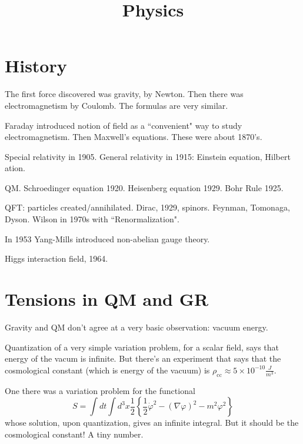 



\title{Physics}
\maketitle

\label{section-phantom}

\tableofcontents

\section{History}
\label{section-history}

The first force discovered was gravity, by Newton. Then there was
electromagnetism by Coulomb. The formulas are very similar.

Faraday introduced notion of field as a ``convenient" way to study
electromagnetism. Then Maxwell's equations. These were about 1870's.

Special relativity in 1905. General relativity in 1915: Einstein equation, Hilbert
ation.

QM. Schroedinger equation 1920. Heisenberg equation 1929. Bohr Rule 1925.

QFT: particles created/annihilated. Dirac, 1929, spinors. Feynman, Tomonaga,
Dyson. Wilson in 1970s with ``Renormalization".

In 1953 Yang-Mills introduced non-abelian gauge theory.

Higgs interaction field, 1964.

\section{Tensions in QM and GR}
\label{section-tensions}

Gravity and QM don't agree at a very basic observation: vacuum energy.

Quantization of a very simple variation problem, for a scalar field, says that
energy of the vacum is infinite. But there's an experiment that says that the
cosmological constant (which is energy of the vacuum) is
 $\rho_{\operatorname{cc}}\approx 5 \times 10^{-10}\frac{J}{m^3}$.

One there was a variation problem for the functional
$$
S=\int dt \int d^3x \frac{1}{2}\left\{ \frac{1}{2}\dot\varphi^2-(\nabla \varphi)^2-m^2\varphi^2\right\} 
$$
whose solution, upon quantization, gives an infinite integral. But it should be
the cosmological constant! A tiny number.


